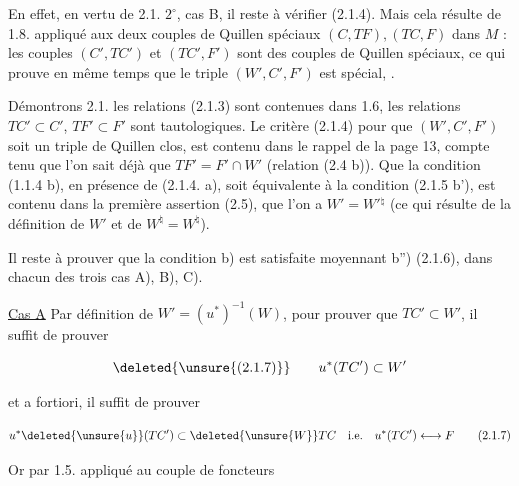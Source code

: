 En effet, en vertu de 2.1. $2^\circ$, cas B,  il reste
à vérifier  (2.1.4). Mais cela résulte
de 1.8. appliqué aux deux couples de Quillen
spéciaux $(C,TF),(TC,F)$ dans $M$ : les couples
$(C',TC')$ et $(TC',F')$ sont des couples de Quillen
spéciaux, ce qui prouve en même temps
que le triple $(W',C',F')$ est spécial, .

Démontrons 2.1.  les  relations (2.1.3) sont
contenues dans 1.6, les relations $TC'\subset C'$, $TF'\subset F'$
sont tautologiques. Le critère (2.1.4) pour
que $(W',C',F')$ soit un triple de Quillen clos,
est contenu dans le rappel de la page 13, compte
tenu que l'on sait déjà que $TF'=F'\cap W'$
(relation (2.4 b)). Que la condition (1.1.4 b),
en présence de (2.1.4. a), soit équivalente
à la condition (2.1.5 b'), est contenu dans
la première assertion (2.5),  que
l'on a $W'=W'{}^{\natural}$ (ce qui résulte de la définition
de $W'$ et de $W^{\natural}=W^{\natural}$).

Il reste à prouver  que la condition b) est
 satisfaite  moyennant  b'') (2.1.6),
dans chacun des trois cas A), B), C).

\uline{Cas A} Par définition de $W'=(u^*)^{-1}(W)$, pour
prouver que  $TC'\subset W'$, il suffit de prouver

\[
\deleted{\unsure{(2.1.7)}}\qquad u^*(TC')\subset W'
\]

et a fortiori, il suffit de prouver

\[
u^*\deleted{\unsure{u}}(TC')\subset\deleted{\unsure{W}}TC\quad\text{i.e.}\quad u^*(TC')\longleftrightarrow F\tag*{(2.1.7)}
\]

Or par 1.5. appliqué au couple de foncteurs
